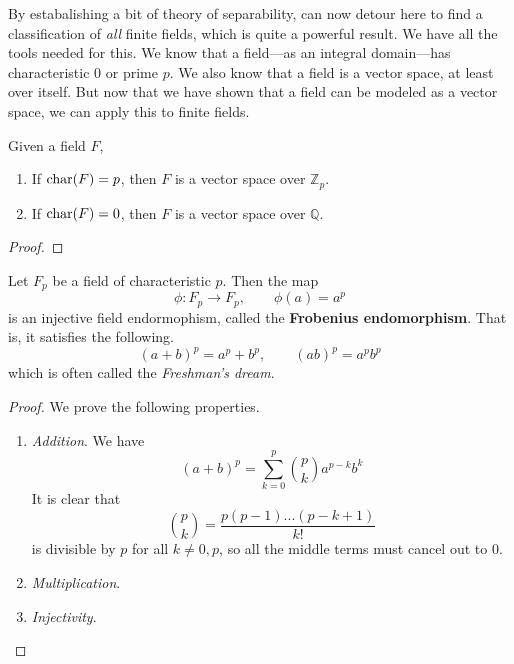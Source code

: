   By estabalishing a bit of theory of separability, can now detour here to find a classification of \textit{all} finite fields, which is quite a powerful result. We have all the tools needed for this. We know that a field---as an integral domain---has characteristic $0$ or prime $p$. We also know that a field is a vector space, at least over itself. But now that we have shown that a field can be modeled as a vector space, we can apply this to finite fields. 

  \begin{theorem}
    \label{thm:char_field}
    Given a field $F$, 
    \begin{enumerate}
      \item If $\Char(F) = p$, then $F$ is a vector space over $\mathbb{Z}_p$. 
      \item If $\Char(F) = 0$, then $F$ is a vector space over $\mathbb{Q}$. 
    \end{enumerate}
  \end{theorem}
  \begin{proof}
    
  \end{proof} 

  \begin{definition}
    Let $F_p$ be a field of characteristic $p$. Then the map 
    \begin{equation}
      \phi: F_p \to F_p, \qquad \phi(a) = a^p
    \end{equation}
    is an injective field endormophism, called the \textbf{Frobenius endomorphism}. That is, it satisfies the following. 
    \begin{equation}
      (a + b)^p = a^p + b^p, \qquad (ab)^p = a^p b^p
    \end{equation}
    which is often called the \textit{Freshman's dream}. 
  \end{definition}
  \begin{proof}
    We prove the following properties. 
    \begin{enumerate}
      \item \textit{Addition}. We have 
      \begin{equation}
        (a + b)^p = \sum_{k = 0}^p \binom{p}{k} a^{p-k} b^{k}
      \end{equation}
      It is clear that 
      \begin{equation}
        \binom{p}{k} = \frac{p (p-1) ... (p - k+1)}{k!}
      \end{equation}
      is divisible by $p$ for all $k \neq 0, p$, so all the middle terms must cancel out to $0$. 

      \item \textit{Multiplication}. 

      \item \textit{Injectivity}. 
    \end{enumerate}
  \end{proof}

